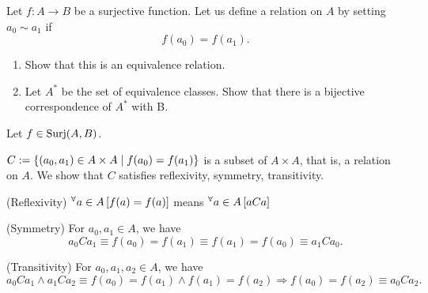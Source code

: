 \documentclass[a4paper,12pt]{article}
\begin{document}
\begin{exe}
	Let \( f:A\to B \) be a surjective function.
	Let us define a relation on \( A \) by setting \( a_0 \sim a_1 \) if
	\begin{equation*}
		f(a_0) = f(a_1).
	\end{equation*}
	\begin{enumerate}
		\item
		      Show that this is an equivalence relation.
		      
		\item
		      Let \( A^{\ast} \) be the set of equivalence classes.
		      Show that there is a bijective correspondence of \( A^{\ast} \) with B.
	\end{enumerate}
\end{exe}\begin{sol}
	Let
	\( f \in \mathrm{Surj}(A,B) \).
	
	\( C:=\left\{ (a_0,a_1) \in A \times A \;|\; f(a_0)=f(a_1) \right\} \)
	is a subset of \( A \times A \), that is, a relation on \( A \).
	We show that
	\( C \) satisfies reflexivity, symmetry, transitivity.
	
	(Reflexivity)
	\( {}^{\forall}  a \in A\left[ f(a) = f(a) \right] \)
	means
	\( {}^{\forall}  a \in A\left[ aCa \right] \)
	
	(Symmetry)
	For
	\( a_0, a_1  \in A\),
	we have
	\begin{equation*}
		a_0Ca_1
		\equiv
		f(a_0) = f(a_1)
		\equiv
		f(a_1) = f(a_0)
		\equiv
		a_1Ca_0.
	\end{equation*}
	
	(Transitivity)
	For
	\( a_0, a_1,a_2  \in A\),
	we have
	\begin{equation*}
		a_0Ca_1
		\wedge
		a_1Ca_2
		\equiv
		f(a_0) = f(a_1)
		\wedge
		f(a_1) = f(a_2)
		\Rightarrow
		f(a_0) = f(a_2)
		\equiv
		a_0Ca_2.
	\end{equation*}
	

\end{sol}
\end{document}
